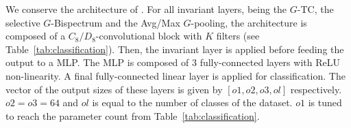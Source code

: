 \documentclass{article}
\theoremstyle{plain}
\theoremstyle{definition}
\theoremstyle{remark}
\begin{document}
We conserve the architecture of \citep{sanborn2023general}. For all invariant layers, being the $G$-TC, the selective $G$-Bispectrum and the Avg/Max $G$-pooling, the architecture is composed of a $C_8/D_8$-convolutional block with $K$ filters (see Table~\ref{tab:classification}). Then, the invariant layer is applied before feeding the output to a MLP. The MLP is composed of $3$ fully-connected layers with ReLU non-linearity. A final fully-connected linear layer is applied for classification. The vector of the output sizes of these layers is given by $[o1,o2,o3,ol]$ respectively. $o2=o3 = 64$ and $ol$ is equal to the number of classes of the dataset. $o1$ is tuned to reach the parameter count from Table~\ref{tab:classification}.

\end{document}
